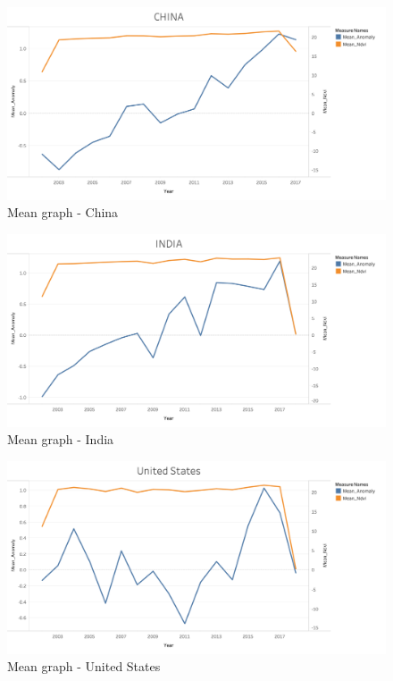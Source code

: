 \begin{itemize}
    \begin{figure}[H]
            \centering
            \includegraphics[width=1.0\linewidth]{figures/ch5/Mean/CHINA_mean.png}
            \caption{Mean graph - China}\label{Fig:CHINA_mean}
    \end{figure}
    
    \begin{figure}[H]
            \centering
            \includegraphics[width=1.0\linewidth]{figures/ch5/Mean/INDIA_mean.png}
            \caption{Mean graph - India}\label{Fig:INDIA_mean}
    \end{figure}
    
     \begin{figure}[H]
            \centering
            \includegraphics[width=1.0\linewidth]{figures/ch5/Mean/US_mean.png}
            \caption{\label{fig:US_mean}Mean graph - United States}
    \end{figure}


\end{itemize}
